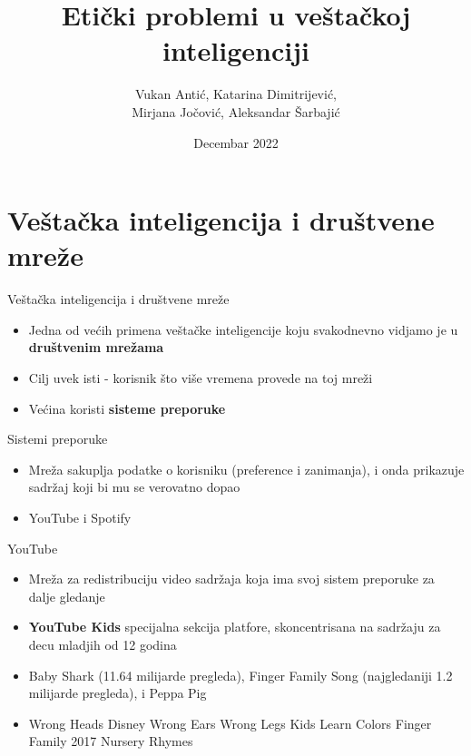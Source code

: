 \documentclass[14pt, aspectratio=169]{beamer}
\title{Etički problemi u veštačkoj inteligenciji}
\author{Vukan Antić, Katarina Dimitrijević, \\ Mirjana Jočović, Aleksandar Šarbajić}
\date{Decembar 2022}
\begin{document}
\maketitle

\section{Veštačka inteligencija i društvene mreže}

\begin{frame}{Veštačka inteligencija i društvene mreže}
    \begin{itemize}
        \item Jedna od većih primena veštačke inteligencije koju svakodnevno vidjamo je u \textbf{društvenim mrežama}
    \end{itemize}
    \begin{itemize}
        \item Cilj uvek isti - korisnik što više vremena provede na toj mreži
    \end{itemize}
    \begin{itemize}
        \item Većina koristi \textbf{sisteme preporuke}
    \end{itemize}
\end{frame}

\begin{frame}{Sistemi preporuke}
    \begin{itemize}
        \item Mreža sakuplja podatke o korisniku (preference i zanimanja), i onda prikazuje sadržaj koji bi mu se verovatno dopao
    \end{itemize}
    \begin{itemize}
        \item YouTube i Spotify
    \end{itemize}
\end{frame}

\begin{frame}{YouTube}
    \begin{itemize}
        \item Mreža za redistribuciju video sadržaja koja ima svoj sistem preporuke za dalje gledanje
    \end{itemize}
    \begin{itemize}
        \item \textbf{YouTube Kids} specijalna sekcija platfore, skoncentrisana na sadržaju za decu mladjih od 12 godina
        \item Baby Shark (11.64 milijarde pregleda), Finger Family Song (najgledaniji 1.2 milijarde pregleda), i Peppa Pig
        \item Wrong Heads Disney Wrong
        Ears Wrong Legs Kids Learn Colors Finger Family 2017 Nursery Rhymes
    \end{itemize}
\end{frame}
\end{document}
